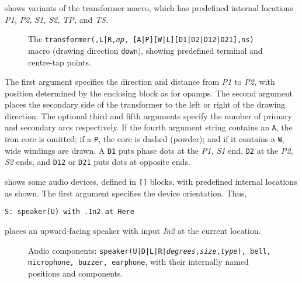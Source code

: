  shows variants of the transformer macro,
which has predefined internal locations
{\sl P1,} {\sl P2,} {\sl S1,} {\sl S2,} {\sl TP,} and {\sl TS.}
\begin{figure}[h!t]
   
  \caption{The {\tt transformer(\linespec,L|R,{\sl np},%
[A|P][W|L][D1|D2|D12|D21],{\sl ns})}
     macro (drawing direction {\tt down}), showing predefined terminal
     and centre-tap points.}
   \label{Xform}
   \end{figure}
The first argument
specifies the direction and distance from {\sl P1} to {\sl P2}, with
position determined by the enclosing block as for opamps.  The second
argument places the secondary side of the transformer to the left
or right of the drawing direction.  The optional third and fifth arguments
specify the number of primary and secondary arcs respectively.
If the fourth argument string contains an {\tt A}, the iron core
is omitted; 
if a {\tt P}, the core is dashed (powder);
and if it contains a {\tt W}, wide windings are drawn.
A {\tt D1} puts phase dots at the {\sl P1, S1} end, {\tt D2} at the
{\sl P2, S2} ends, and {\tt D12} or {\tt D21} puts dots at opposite ends.

 shows some audio devices, defined in {\tt []} blocks,
with predefined internal locations as shown.
The first argument specifies the device orientation.
Thus,
\par
{\tt S: speaker(U) with .In2 at Here}

\noindent
places an upward-facing speaker with input {\sl In2} at the
current location.
\begin{figure}[ht]
   
   \caption{Audio components:
   {\tt speaker(U|D|L|R|{\sl degrees},{\sl size},{\sl type}),
     bell, microphone, buzzer,
     earphone}, with their internally named positions and components.}
   \label{Audio}
   \end{figure}

